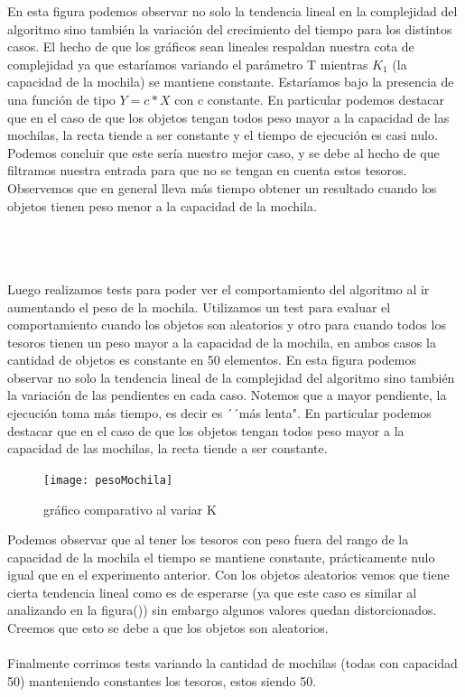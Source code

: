 \documentclass[spanish,12pt]{article}
\begin{document}
En esta figura podemos observar no solo la tendencia lineal en la complejidad del algoritmo sino también la variación del crecimiento del tiempo para los distintos casos.
El hecho de que los gráficos sean lineales respaldan nuestra cota de complejidad ya que estaríamos variando el parámetro T mientras $K_1$ (la capacidad de la mochila) se mantiene constante. Estaríamos bajo la presencia de una función de tipo $Y=c*X$ con c constante.
En particular podemos destacar que en el caso de que los objetos tengan todos peso mayor a la capacidad de las mochilas, la recta tiende a ser constante y el tiempo de ejecución es casi nulo.
Podemos concluir que este sería nuestro mejor caso, y se debe al hecho de que filtramos nuestra entrada para que no se tengan en cuenta estos tesoros.
Observemos que en general lleva más tiempo obtener un resultado cuando los objetos tienen peso menor a la capacidad de la mochila.

\\
\\
\\
Luego realizamos tests para poder ver el comportamiento del algoritmo al ir aumentando el peso de la mochila. Utilizamos un test para evaluar el comportamiento cuando los objetos son aleatorios y otro para cuando todos los tesoros tienen un peso mayor a la capacidad de la mochila, en ambos casos la cantidad de objetos es constante en 50 elementos.
En esta figura podemos observar no solo la tendencia lineal de la complejidad del algoritmo sino también la variación de las pendientes en cada caso. Notemos que a mayor pendiente, la ejecución toma más tiempo, es decir es ´´más lenta".
En particular podemos destacar que en el caso de que los objetos tengan todos peso mayor a la capacidad de las mochilas, la recta tiende a ser constante.

\begin{figure}[H]
\centering
\texttt{[image: pesoMochila]}
\caption{gráfico comparativo al variar K}
\end{figure}

Podemos observar que al tener los tesoros con peso fuera del rango de la capacidad de la mochila el tiempo se mantiene constante, prácticamente nulo igual que en el experimento anterior. Con los objetos aleatorios vemos que tiene cierta tendencia lineal como es de esperarse (ya que este caso es similar al analizando en la figura()) sin embargo algunos valores quedan distorcionados. Creemos que esto se debe a que los objetos son aleatorios.
\\
\\
Finalmente corrimos tests variando la cantidad de mochilas (todas con capacidad 50) manteniendo constantes los tesoros, estos siendo 50.
\end{document}
